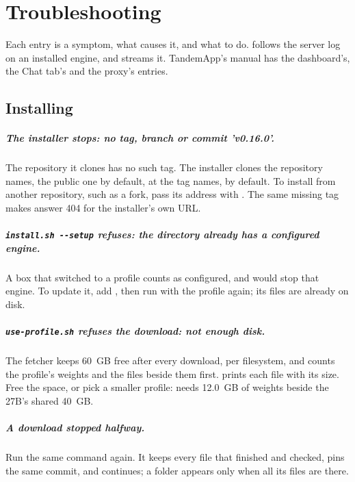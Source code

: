 \chapter{Troubleshooting}\label{ch:troubleshooting}

Each entry is a symptom, what causes it, and what to do.  follows the server log on an installed engine, and  streams it. TandemApp's manual has the dashboard's, the Chat tab's and the proxy's entries.

\section{Installing}\label{sec:trouble-install}

\paragraph{The installer stops: no tag, branch or commit 'v0.16.0'.} The repository it clones has no such tag. The installer clones the repository  names, the public one by default, at the tag  names,  by default. To install from another repository, such as a fork, pass its address with . The same missing tag makes  answer 404 for the installer's own URL.

\paragraph{\texttt{install.sh -{}-setup} refuses: the directory already has a configured engine.} A box that switched to a profile counts as configured, and  would stop that engine. To update it, add , then run  with the profile again; its files are already on disk.

\paragraph{\texttt{use-profile.sh} refuses the download: not enough disk.} The fetcher keeps 60~GB free after every download, per filesystem, and counts the profile's weights and the files beside them first.  prints each file with its size. Free the space, or pick a smaller profile:  needs 12.0~GB of weights beside the 27B's shared 40~GB.

\paragraph{A download stopped halfway.} Run the same  command again. It keeps every file that finished and checked, pins the same commit, and continues; a folder appears only when all its files are there.

